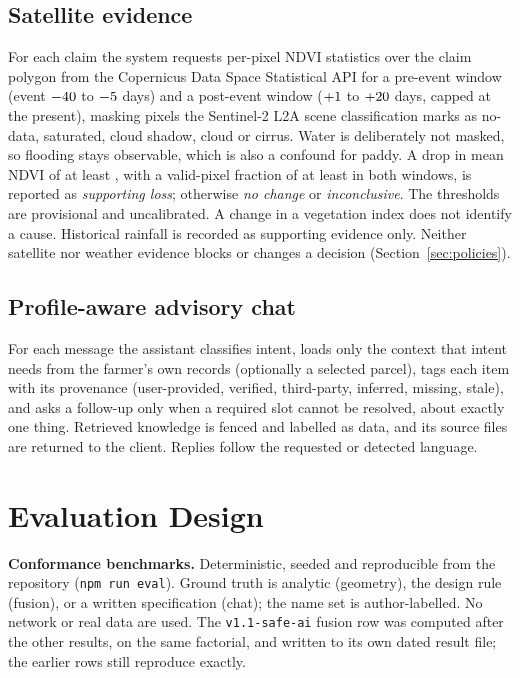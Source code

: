 \documentclass[journal]{IEEEtran}
\begin{document}
\subsection{Satellite evidence}
For each claim the system requests per-pixel NDVI statistics over the claim polygon from the Copernicus Data Space Statistical API \cite{cdse_statistical} for a pre-event window (event $-40$ to $-5$ days) and a post-event window ($+1$ to $+20$ days, capped at the present), masking pixels the Sentinel-2 L2A scene classification marks as no-data, saturated, cloud shadow, cloud or cirrus. Water is deliberately not masked, so flooding stays observable, which is also a confound for paddy. A drop in mean NDVI of at least \SatNdviDropSupport{}, with a valid-pixel fraction of at least \SatMinValidPixelFraction{} in both windows, is reported as \emph{supporting loss}; otherwise \emph{no change} or \emph{inconclusive}. The thresholds are provisional and uncalibrated. A change in a vegetation index does not identify a cause. Historical rainfall \cite{openmeteo_hist} is recorded as supporting evidence only. Neither satellite nor weather evidence blocks or changes a decision (Section~\ref{sec:policies}).

\subsection{Profile-aware advisory chat}
For each message the assistant classifies intent, loads only the context that intent needs from the farmer's own records (optionally a selected parcel), tags each item with its provenance (user-provided, verified, third-party, inferred, missing, stale), and asks a follow-up only when a required slot cannot be resolved, about exactly one thing. Retrieved knowledge is fenced and labelled as data, and its source files are returned to the client. Replies follow the requested or detected language.

\section{Evaluation Design}
\textbf{Conformance benchmarks.} Deterministic, seeded and reproducible from the repository (\texttt{npm run eval}). Ground truth is analytic (geometry), the design rule (fusion), or a written specification (chat); the name set is author-labelled. No network or real data are used. The \texttt{v1.1-safe-ai} fusion row was computed after the other results, on the same factorial, and written to its own dated result file; the earlier rows still reproduce exactly.
\end{document}
